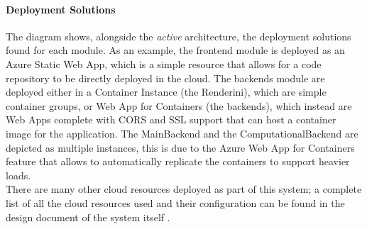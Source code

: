 \paragraph{Deployment Solutions}
  The diagram shows, alongside the \textit{active} architecture, the deployment solutions found for each module. As an example, the frontend module is deployed as an Azure Static Web App, which is a simple resource that allows for a code repository to be directly deployed in the cloud. The backends module are deployed either in a Container Instance (the Renderini), which are simple container groups, or Web App for Containers (the backends), which instead are Web Apps complete with CORS and SSL support that can host a container image for the application. The MainBackend and the ComputationalBackend are depicted as multiple instances, this is due to the Azure Web App for Containers feature that allows to automatically replicate the containers to support heavier loads.\\
  There are many other cloud resources deployed as part of this system; a complete list of all the cloud resources used and their configuration can be found in the design document of the system itself \cite{MNCDesignDoc}.

